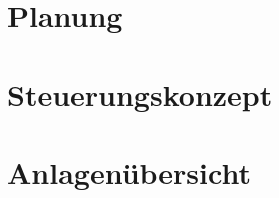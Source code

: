 \documentclass[
  a4paper,
  oneside,
  11pt,
  headsepline,
  bibliography=totoc,
  listof=totoc,   %
  final
]
{scrbook}
\begin{document}
\frontmatter

\setcounter{tocdepth}{1}
\tableofcontents
\listoffigures
\printnomenclature%

\mainmatter{}


%

\chapter{Planung}
\label{chap:planning}















\appendix
\chapter{Steuerungskonzept}
\label{appndx:controlConcept}


\chapter{Anlagenübersicht}
\label{appndx:machineOverview}

\end{document}
